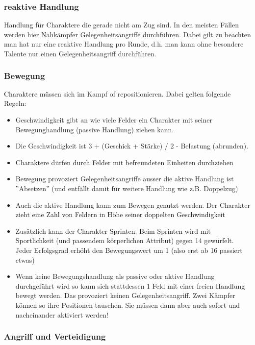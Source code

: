 \documentclass{article}
\begin{document}
\subsubsection{reaktive Handlung}

Handlung für Charaktere die gerade nicht am Zug sind. In den meisten Fällen werden hier Nahkämpfer
Gelegenheitsangriffe durchführen. Dabei gilt zu beachten man hat nur eine reaktive Handlung pro Runde, d.h. man kann
ohne besondere Talente nur einen Gelegenheitsangriff durchführen.

\subsubsection{Bewegung}

Charaktere müssen sich im Kampf of repositionieren. Dabei gelten folgende Regeln:

\begin{itemize}
\item Geschwindigkeit gibt an wie viele Felder ein Charakter mit seiner Bewegunghandlung (passive Handlung) ziehen kann.
\item Die Geschwindigkeit ist 3 + (Geschick + Stärke) / 2 - Belastung (abrunden).
\item Charaktere dürfen durch Felder mit befreundeten Einheiten durchziehen
\item Bewegung provoziert Gelegenheitsangriffe ausser die aktive Handlung ist ''Absetzen'' (und entfällt damit für weitere Handlung wie z.B. Doppelzug)
\item Auch die aktive Handlung kann zum Bewegen genutzt werden. Der Charakter zieht eine Zahl von Feldern in Höhe seiner doppelten Geschwindigkeit
\item Zusätzlich kann der Charakter Sprinten. Beim Sprinten wird mit Sportlichkeit (und passendem körperlichen Attribut) gegen 14 gewürfelt. Jeder Erfolgsgrad erhöht den Bewegungswert um 1 (also erst ab 16 passiert etwas)
\item Wenn keine Bewegungshandlung als passive oder aktive Handlung durchgeführt wird so kann sich stattdessen 1 Feld mit einer freien Handlung bewegt werden. Das provoziert keinen Gelegenheitsangriff. Zwei Kämpfer können so ihre Positionen tauschen. Sie müssen dann aber auch sofort und nacheinander aktiviert werden!
\end{itemize}

\subsubsection{Angriff und Verteidigung}
\end{document}
